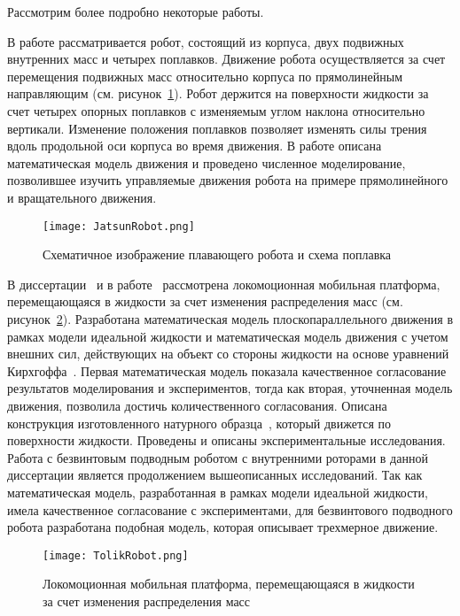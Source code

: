 Рассмотрим более подробно некоторые работы.

В работе \cite{Volkova_Jatsun} рассматривается робот, состоящий из корпуса, двух подвижных внутренних масс и четырех поплавков. Движение робота осуществляется за счет перемещения подвижных масс относительно корпуса по прямолинейным направляющим (см. рисунок~\ref{JatsunRobot}). Робот держится на поверхности жидкости за счет четырех опорных поплавков с изменяемым углом наклона относительно вертикали. Изменение положения поплавков позволяет изменять силы трения вдоль продольной оси корпуса во время движения. В работе описана математическая модель движения и проведено численное моделирование, позволившее изучить управляемые движения робота на примере прямолинейного и вращательного движения.

\begin{figure}[h]
	\centering
	\texttt{[image: JatsunRobot.png]}%
	\caption{Схематичное изображение плавающего робота и схема поплавка}
	\label{JatsunRobot}
\end{figure}

В диссертации~\cite{Klenov_diss} и в работе~\cite{Klenov_Kilin_2016} рассмотрена локомоционная мобильная платформа, перемещающаяся в жидкости за счет изменения распределения масс (см. рисунок~\ref{TolikRobot}). Разработана математическая модель плоскопараллельного движения в рамках модели идеальной жидкости и математическая модель движения с учетом внешних сил, действующих на объект со стороны жидкости на основе уравнений Кирхгоффа~\cite{Kirchhoff}. Первая математическая модель показала качественное согласование результатов моделирования и экспериментов, тогда как вторая, уточненная модель движения, позволила достичь количественного согласования. Описана конструкция изготовленного натурного образца~\cite{patent_BNR}, который движется по поверхности жидкости. Проведены и описаны экспериментальные исследования. Работа с безвинтовым подводным роботом с внутренними роторами в данной диссертации является продолжением вышеописанных исследований. Так как математическая модель, разработанная в рамках модели идеальной жидкости, имела качественное согласование с экспериментами, для безвинтового подводного робота разработана подобная модель, которая описывает трехмерное движение.

\begin{figure}[h]
	\centering
	\texttt{[image: TolikRobot.png]}%
	\caption{Локомоционная мобильная платформа, перемещающаяся в жидкости за счет изменения распределения масс}
	\label{TolikRobot}
\end{figure}

